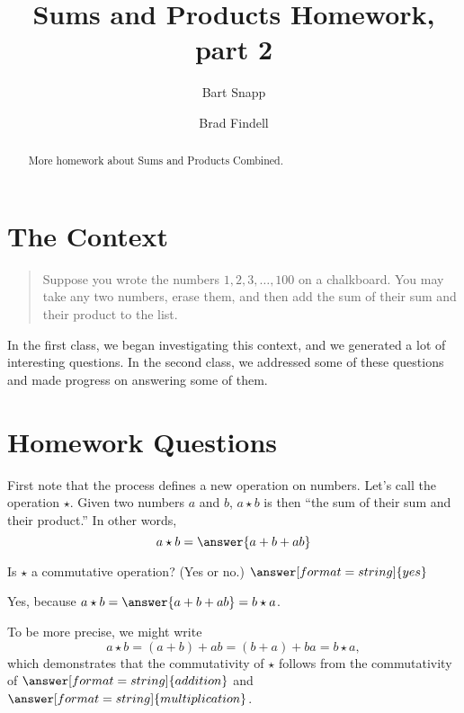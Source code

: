 \documentclass{ximera}
\title{Sums and Products Homework, part 2}
\author{Bart Snapp \and Brad Findell}
\begin{document}
\begin{abstract}
More homework about Sums and Products Combined. 
\end{abstract}
\maketitle


\section*{The Context}
\begin{quote}
Suppose you wrote the numbers $1,2,3,\dots,100$ on a chalkboard. You
may take any two numbers, erase them, and then add the sum of their
sum and their product to the list.
\end{quote}

In the first class, we began investigating this context, and we generated a lot of interesting questions.  
In the second class, we addressed some of these questions and made progress on answering some of them.  

\section*{Homework Questions}

\begin{problem}
First note that the process defines a new operation on numbers.  Let's call the operation $\star$.  Given two numbers $a$ and $b$,  $a\star b$ is then ``the sum of their sum and their product.''    In other words, 
\[
a\star b = \answer{a+b+ab}
\]
\end{problem}

\begin{problem}
Is $\star$ a commutative operation?  (Yes or no.) $\answer[format=string]{yes}$

\begin{explanation}
Yes, because $a\star b = \answer{a+b+ab}  = b\star a$.  

\begin{question}
To be more precise, we might write 
\[
a\star b = (a+b)+ab= (b+a)+ba = b\star a,
\]
which demonstrates that the commutativity of $\star$ follows from the commutativity of 
$\answer[format=string]{addition}$ and $\answer[format=string]{multiplication}$. 
\end{question}
\end{explanation}
\end{problem}
\end{document}

